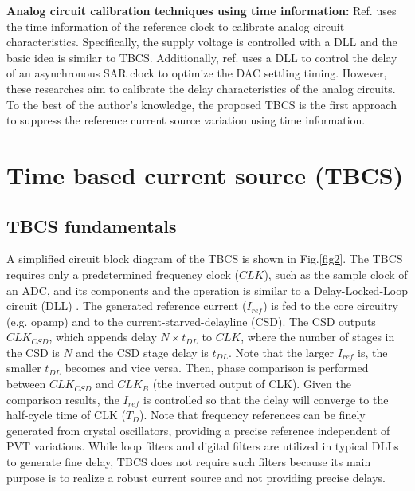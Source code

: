 \documentclass[paper]{ieice}
\begin{document}
\textbf{Analog circuit calibration techniques using time information:} Ref.\cite{zhu} uses the time information of the reference clock to calibrate analog circuit characteristics. Specifically, the supply voltage is controlled with a DLL and the basic idea is similar to TBCS. Additionally, ref.\cite{kapusta201314b,tompson} uses a DLL to control the delay of an asynchronous SAR clock to optimize the DAC settling timing.
However, these researches aim to calibrate the delay characteristics of the analog circuits. To the best of the author's knowledge, the proposed TBCS is the first approach to suppress the reference current source variation using time information.

\section{Time based current source (TBCS)}
\subsection{TBCS fundamentals}
\qquad A simplified circuit block diagram of the TBCS is shown in Fig.\ref{fig2}. The TBCS requires only a  predetermined frequency clock ($CLK$), such as the sample clock of an ADC, and its components and the operation is similar to a Delay-Locked-Loop circuit (DLL) \cite{ sidiropoulos1997semidigital, lee19942, razavi2018delay}. The generated reference current ($I_{ref}$) is fed to the core circuitry (e.g. opamp) and to the current-starved-delayline (CSD). The CSD outputs $CLK_{CSD}$, which appends delay $N \times t_{DL}$ to $CLK$, where the number of stages in the CSD is $N$ and the CSD stage delay is $t_{DL}$. Note that the larger $I_{ref}$ is, the smaller $t_{DL}$ becomes and vice versa. 
Then, phase comparison is performed between $CLK_{CSD}$ and $CLK_B$ (the inverted output of CLK). Given the comparison results, the $I_{ref}$ is controlled so that the delay will converge to the half-cycle time of CLK ($T_D$). Note that frequency references can be finely generated from crystal oscillators, providing a precise reference independent of PVT variations. While loop filters \cite{sidiropoulos1997semidigital} and digital filters \cite{kim20172} are utilized in typical DLLs to generate fine delay, TBCS does not require such filters because its main purpose is to realize a robust current source and not providing precise delays.
\end{document}
